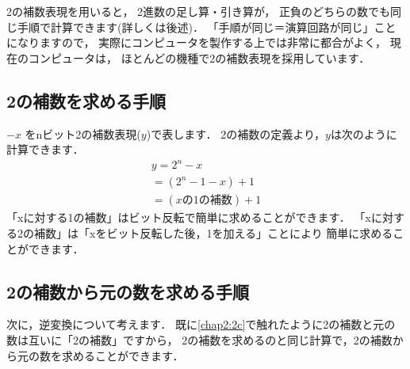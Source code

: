 2の補数表現を用いると，
2進数の足し算・引き算が，
正負のどちらの数でも同じ手順で計算できます(詳しくは後述)．
「手順が同じ＝演算回路が同じ」ことになりますので，
実際にコンピュータを製作する上では非常に都合がよく，
現在のコンピュータは，
ほとんどの機種で2の補数表現を採用しています．

\subsection{2の補数を求める手順}

$-x$ をnビット2の補数表現($y$)で表します．
2の補数の定義より，$y$は次のように計算できます．
{\small
\begin{eqnarray}
y = 2^n - x                  \label{equb} \\
  = (2^n - 1 - x) + 1        \nonumber    \\
  = ( xの1の補数 ) + 1       \nonumber
\end{eqnarray}
}
「xに対する1の補数」はビット反転で簡単に求めることができます．
「xに対する2の補数」は「xをビット反転した後，1を加える」ことにより
簡単に求めることができます．

\begin{center}
\end{center}

\subsection{2の補数から元の数を求める手順}
\label{hanten}

次に，逆変換について考えます．
既に\ref{chap2:2c}で触れたように2の補数と元の数は互いに「2の補数」ですから，
2の補数を求めるのと同じ計算で，2の補数から元の数を求めることができます．


\begin{center}
\end{center}


